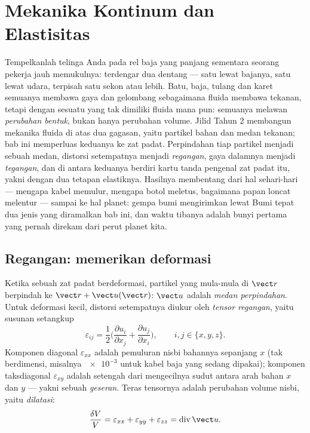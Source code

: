 \chapter{Mekanika Kontinum dan Elastisitas}\label{ch:b3:continuum-elasticity}

Tempelkanlah telinga Anda pada rel baja yang panjang sementara seorang
pekerja jauh memukulnya: terdengar dua dentang --- satu lewat bajanya,
satu lewat udara, terpisah satu sekon atau lebih. Batu, baja, tulang dan
karet semuanya membawa gaya dan gelombang sebagaimana fluida membawa
tekanan, tetapi dengan sesuatu yang tak dimiliki fluida mana pun:
semuanya melawan \emph{perubahan bentuk}, bukan hanya perubahan volume.
Jilid Tahun 2 membangun mekanika fluida di atas dua gagasan, yaitu
partikel bahan dan medan tekanan; bab ini memperluas keduanya ke zat
padat. Perpindahan tiap partikel menjadi sebuah medan, distorsi
setempatnya menjadi \emph{regangan}, gaya dalamnya menjadi
\emph{tegangan}, dan di antara keduanya berdiri kartu tanda pengenal zat
padat itu, yakni  dengan dua tetapan elastiknya. Hasilnya
membentang dari hal sehari-hari --- mengapa kabel memulur, mengapa botol
meletus, bagaimana papan loncat melentur --- sampai ke hal planet: gempa
bumi mengirimkan lewat Bumi tepat dua jenis  yang
diramalkan bab ini, dan waktu tibanya adalah bunyi pertama yang pernah
direkam dari perut planet kita.

\section{Regangan: memerikan deformasi}

\begin{definition}\label{def:b3:continuum-elasticity:strain}
Ketika sebuah zat padat berdeformasi, partikel yang mula-mula di
$\vect r$ berpindah ke
$\vect r + \vect u(\vect r)$: $\vect u$ adalah \emph{medan
perpindahan}. Untuk deformasi kecil, distorsi setempatnya diukur oleh
\emph{tensor regangan}, yaitu susunan setangkup
\[
\varepsilon_{ij} = \frac12\Big(
 \frac{\partial u_i}{\partial x_j} + \frac{\partial u_j}{\partial x_i}
\Big) , \qquad i, j \in \{x, y, z\} .
\]
Komponen diagonal $\varepsilon_{xx}$ adalah pemuluran nisbi bahannya
sepanjang $x$ (tak berdimensi, misalnya $\num{e-3}$ untuk kabel baja
yang sedang dipakai); komponen taksdiagonal $\varepsilon_{xy}$ adalah
setengah dari mengecilnya sudut antara arah bahan $x$ dan $y$ --- yakni
sebuah \emph{geseran}. Teras tensornya adalah perubahan volume nisbi,
yaitu \emph{dilatasi}:
\[
\frac{\delta V}{V} = \varepsilon_{xx} + \varepsilon_{yy} +
\varepsilon_{zz} = \operatorname{div}\vect u .
\]
\end{definition}

